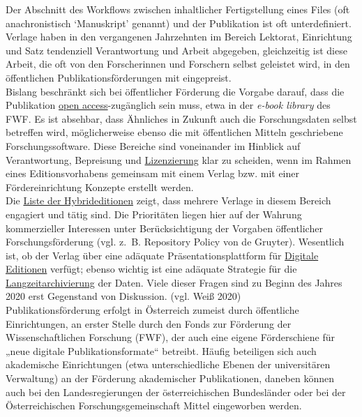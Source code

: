 \documentclass{article}
\begin{document}
        Der Abschnitt des Workflows zwischen inhaltlicher Fertigstellung eines Files (oft anachronistisch ‘Manuskript’ genannt) und der Publikation ist oft unterdefiniert. Verlage haben in den vergangenen Jahrzehnten im Bereich Lektorat, Einrichtung und Satz tendenziell Verantwortung und Arbeit abgegeben, gleichzeitig ist diese Arbeit, die oft von den Forscherinnen und Forschern selbst geleistet wird, in den öffentlichen Publikationsförderungen mit eingepreist.\\
            
        Bislang beschränkt sich bei öffentlicher Förderung die Vorgabe darauf, dass die Publikation \href{http://gams.uni-graz.at/o:konde.152}{open access}-zugänglich sein muss, etwa in der \emph{e-book library} des FWF. Es ist absehbar, dass Ähnliches in Zukunft auch die Forschungsdaten selbst betreffen wird, möglicherweise ebenso die mit öffentlichen Mitteln geschriebene Forschungssoftware. Diese Bereiche sind voneinander im Hinblick auf Verantwortung, Bepreisung und \href{http://gams.uni-graz.at/o:konde.119}{Lizenzierung} klar zu scheiden, wenn im Rahmen eines Editionsvorhabens gemeinsam mit einem Verlag bzw. mit einer Fördereinrichtung Konzepte erstellt werden.\\
            
        Die \href{http://gams.uni-graz.at/o:konde.117}{Liste der Hybrideditionen} zeigt, dass mehrere Verlage in diesem Bereich engagiert und tätig sind. Die Prioritäten liegen hier auf der Wahrung kommerzieller Interessen unter Berücksichtigung der Vorgaben öffentlicher Forschungsförderung (vgl. z. B. Repository Policy von de Gruyter). Wesentlich ist, ob der Verlag über eine adäquate Präsentationsplattform für \href{http://gams.uni-graz.at/o:konde.59}{Digitale Editionen} verfügt; ebenso wichtig ist eine adäquate Strategie für die \href{http://gams.uni-graz.at/o:konde.6}{Langzeitarchivierung} der Daten. Viele dieser Fragen sind zu Beginn des Jahres 2020 erst Gegenstand von Diskussion. (vgl. Weiß 2020)\\
            
        Publikationsförderung erfolgt in Österreich zumeist durch öffentliche Einrichtungen, an erster Stelle durch den Fonds zur Förderung der Wissenschaftlichen Forschung (FWF), der auch eine eigene Förderschiene für „neue digitale Publikationsformate“ betreibt. Häufig beteiligen sich auch akademische Einrichtungen (etwa unterschiedliche Ebenen der universitären Verwaltung) an der Förderung akademischer Publikationen, daneben können auch bei den Landesregierungen der österreichischen Bundesländer oder bei der Österreichischen Forschungsgemeinschaft Mittel eingeworben werden. \\
            
\end{document}
